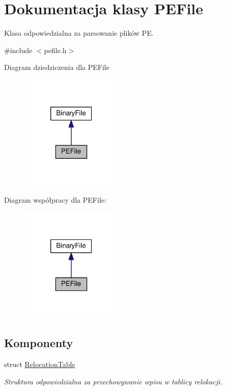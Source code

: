 \hypertarget{class_p_e_file}{\section{Dokumentacja klasy P\-E\-File}
\label{class_p_e_file}
}


Klasa odpowiedzialna za parsowanie plików P\-E.  




{\ttfamily \#include $<$pefile.\-h$>$}



Diagram dziedziczenia dla P\-E\-File
\nopagebreak
\begin{figure}[H]
\begin{center}
\leavevmode
\includegraphics[width=138pt]{class_p_e_file__inherit__graph}
\end{center}
\end{figure}


Diagram współpracy dla P\-E\-File\-:
\nopagebreak
\begin{figure}[H]
\begin{center}
\leavevmode
\includegraphics[width=138pt]{class_p_e_file__coll__graph}
\end{center}
\end{figure}
\subsection*{Komponenty}
\begin{DoxyCompactItemize}
\item 
struct \hyperlink{struct_p_e_file_1_1_relocation_table}{Relocation\-Table}
\begin{DoxyCompactList}\small\item\em Struktura odpowiedzialna za przechowywanie wpisu w tablicy relokacji. \end{DoxyCompactList}\end{DoxyCompactItemize}
